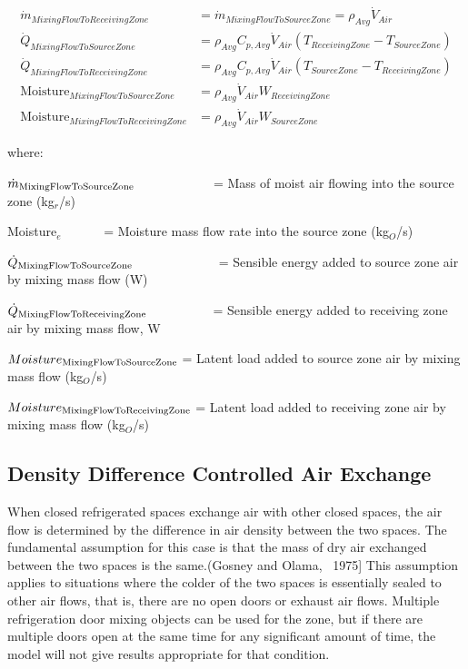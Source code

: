 \begin{equation}
  \begin{array}{cl}
    \dot{m}_{MixingFlowToReceivingZone} & = \dot{m}_{MixingFlowToSourceZone} = \rho_{Avg}\dot{V}_{Air} \\
    \dot{Q}_{MixingFlowToSourceZone}    & = \rho_{Avg} C_{p,Avg} \dot{V}_{Air} \left( T_{ReceivingZone}-T_{SourceZone} \right) \\
    \dot{Q}_{MixingFlowToReceivingZone} & = \rho_{Avg} C_{p,Avg} \dot{V}_{Air} \left( T_{SourceZone} - T_{ReceivingZone} \right) \\
    \text{Moisture}_{MixingFlowToSourceZone} & = \rho_{Avg} \dot{V}_{Air} W_{ReceivingZone} \\
    \text{Moisture}_{MixingFlowToReceivingZone} & = \rho_{Avg} \dot{V}_{Air} W_{SourceZone}
  \end{array}
\end{equation}

where:

\({\dot m_{{\rm{MixingFlowToSourceZone}}}}\) ~~~~~~~~~~~ = Mass of moist air flowing into the source zone (kg\(_{r}\)/s)

Moisture\(_{e}\)~~~~~~ = Moisture mass flow rate into the source zone (kg\(_{O}\)/s)

\({\dot Q_{{\rm{MixingFlowToSourceZone}}}}\) ~~~~~~~~~~~~ = Sensible energy added to source zone air by mixing mass flow (W)

\({\dot Q_{{\rm{MixingFlowToReceivingZone}}}}\) ~~~~~~~~~ = Sensible energy added to receiving zone air by mixing mass flow, W

\(Moistur{e_{{\rm{MixingFlowToSourceZone}}}}\) = Latent load added to source zone air by mixing mass flow (kg\(_{O}\)/s)

\(Moistur{e_{{\rm{MixingFlowToReceivingZone}}}}\) = Latent load added to receiving zone air by mixing mass flow (kg\(_{O}\)/s)

\subsection{Density Difference Controlled Air Exchange}\label{density-difference-controlled-air-exchange}

When closed refrigerated spaces exchange air with other closed spaces, the air flow is determined by the difference in air density between the two spaces. The fundamental assumption for this case is that the mass of dry air exchanged between the two spaces is the same.(Gosney and Olama, ~1975{]} This assumption applies to situations where the colder of the two spaces is essentially sealed to other air flows, that is, there are no open doors or exhaust air flows. Multiple refrigeration door mixing objects can be used for the zone, but if there are multiple doors open at the same time for any significant amount of time, the model will not give results appropriate for that condition.

